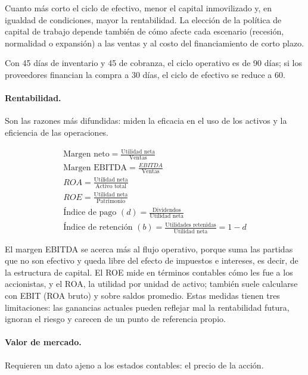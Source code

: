 Cuanto más corto el ciclo de efectivo, menor el capital inmovilizado y, en igualdad de condiciones, mayor la rentabilidad. La elección de la política de capital de trabajo depende también de cómo afecte cada escenario (recesión, normalidad o expansión) a las ventas y al costo del financiamiento de corto plazo.

\begin{ejemplo}[Ciclos]
Con 45 días de inventario y 45 de cobranza, el ciclo operativo es de 90 días; si los proveedores financian la compra a 30 días, el ciclo de efectivo se reduce a 60.
\end{ejemplo}

\paragraph{Rentabilidad.} Son las razones más difundidas: miden la eficacia en el uso de los activos y la eficiencia de las operaciones.

\begin{formulaBox}
\[
\begin{gathered}
\text{Margen neto} = \frac{\text{Utilidad neta}}{\text{Ventas}}
\\[4pt]
\text{Margen EBITDA} = \frac{EBITDA}{\text{Ventas}}
\\[4pt]
ROA = \frac{\text{Utilidad neta}}{\text{Activo total}}
\\[4pt]
ROE = \frac{\text{Utilidad neta}}{\text{Patrimonio}}
\\[4pt]
\text{Índice de pago } (d) = \frac{\text{Dividendos}}{\text{Utilidad neta}}
\\[4pt]
\text{Índice de retención } (b) = \frac{\text{Utilidades retenidas}}{\text{Utilidad neta}} = 1-d
\end{gathered}
\]
\end{formulaBox}

El margen EBITDA se acerca más al flujo operativo, porque suma las partidas que no son efectivo y queda libre del efecto de impuestos e intereses, es decir, de la estructura de capital. El ROE mide en términos contables cómo les fue a los accionistas, y el ROA, la utilidad por unidad de activo; también suele calcularse con EBIT (ROA bruto) y sobre saldos promedio. Estas medidas tienen tres limitaciones: las ganancias actuales pueden reflejar mal la rentabilidad futura, ignoran el riesgo y carecen de un punto de referencia propio.

\paragraph{Valor de mercado.} Requieren un dato ajeno a los estados contables: el precio de la acción.

